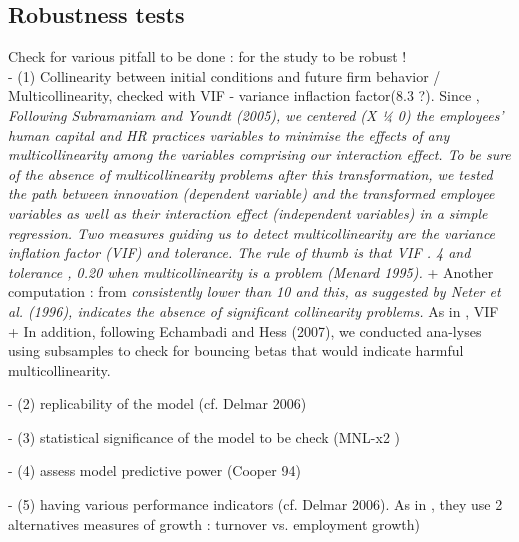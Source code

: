 \begin{itemize}
\begin{itemize}
\subsection{Robustness tests}

Check for various pitfall to be done : for the study to be robust !\\

- (1) Collinearity between initial conditions and future firm behavior / Multicollinearity, checked with VIF - variance inflaction factor(8.3 ?). Since \citep{de2010interrelationships}, \textit{Following Subramaniam and Youndt (2005), we centered (X ¼ 0) the employees’ human capital and HR practices variables to minimise the effects of any multicollinearity among the variables comprising our interaction effect. To be sure of the absence of multicollinearity problems after this transformation, we tested the path between innovation (dependent variable) and the transformed employee variables as well as their interaction effect (independent variables) in a simple regression. Two measures guiding us to detect multicollinearity are the variance inflation factor (VIF) and tolerance. The rule of thumb is that VIF . 4 and tolerance , 0.20 when multicollinearity is a problem (Menard 1995).} + Another computation : from \citep{visintin2014founding} \textit{consistently lower than 10 and this, as suggested by Neter et al. (1996), indicates the absence of significant collinearity problems.}\newline
As in \citet{reese2020should}, VIF + In addition, following Echambadi and Hess (2007), we conducted ana-lyses using subsamples to check for bouncing betas that would indicate harmful multicollinearity.

- (2) replicability of the model (cf. Delmar 2006)\newline

- (3) statistical significance of the model to be check (MNL-x2 \citep{cooper1994initial})\newline

- (4) assess model predictive power (Cooper 94)\newline

- (5) having various performance indicators (cf. Delmar 2006). As in \citet{grillitsch2020does}, they use 2 alternatives measures of growth : turnover vs. employment growth)\newline


\end{itemize}
\end{itemize}
